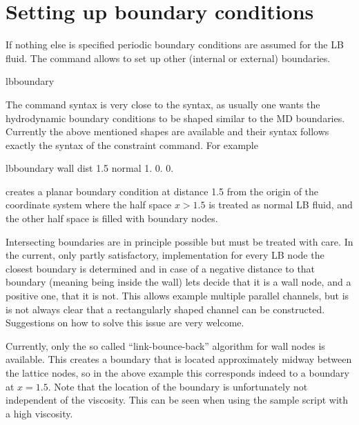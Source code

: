 \section{Setting up boundary conditions}
If nothing else is specified periodic boundary conditions are assumed 
for the LB fluid. The  command allows to set up
other (internal or external) boundaries.
\begin{essyntax}
  lbboundary   
  \begin{features}
  \end{features}
\end{essyntax}
The  command syntax is very close to the
 syntax, as usually one wants the hydrodynamic
boundary conditions to be shaped similar to the MD
boundaries. Currently the above mentioned shapes are available and
their syntax follows exactly the syntax of the constraint command. For
example
\begin{tclcode}
  lbboundary wall dist 1.5 normal 1. 0. 0. 
\end{tclcode}
creates a planar boundary condition at distance 1.5 from the origin of
the coordinate system where the half space $x>1.5$ is treated as
normal LB fluid, and the other half space is filled with boundary
nodes.

Intersecting boundaries are in principle possible but must be treated
with care. In the current, only partly satisfactory, implementation for
every LB node the closest boundary is determined and in case of a
negative distance to that boundary (meaning being inside the wall)
lets \es decide that it is a wall node, and a positive one, that it is
not.  This allows example multiple parallel channels, but is is not
always clear that a rectangularly shaped channel can be
constructed. Suggestions on how to solve this issue are very welcome.

Currently, only the so called ``link-bounce-back'' algorithm for wall
nodes is available. This creates a boundary that is located
approximately midway between the lattice nodes, so in the above
example this corresponds indeed to a boundary at $x=1.5$. Note that
the location of the boundary is unfortunately not independent of the
viscosity. This can \eg be seen when using the sample script
 with a high viscosity.

